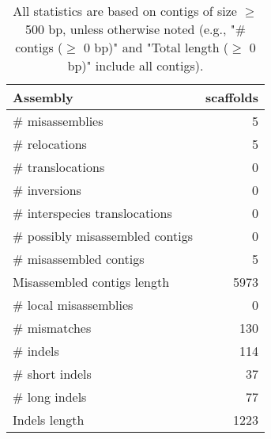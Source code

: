 \documentclass[12pt,a4paper]{article}
\begin{document}
\begin{table}[ht]
\begin{center}
\caption{All statistics are based on contigs of size $\geq$ 500 bp, unless otherwise noted (e.g., "\# contigs ($\geq$ 0 bp)" and "Total length ($\geq$ 0 bp)" include all contigs).}
\begin{tabular}{|l*{1}{|r}|}
\hline
Assembly & scaffolds \\ \hline
\# misassemblies & 5 \\ \hline
\hspace{5mm}\# relocations & 5 \\ \hline
\hspace{5mm}\# translocations & 0 \\ \hline
\hspace{5mm}\# inversions & 0 \\ \hline
\hspace{5mm}\# interspecies translocations & 0 \\ \hline
\# possibly misassembled contigs & 0 \\ \hline
\# misassembled contigs & 5 \\ \hline
Misassembled contigs length & 5973 \\ \hline
\# local misassemblies & 0 \\ \hline
\# mismatches & 130 \\ \hline
\# indels & 114 \\ \hline
\hspace{5mm}\# short indels & 37 \\ \hline
\hspace{5mm}\# long indels & 77 \\ \hline
Indels length & 1223 \\ \hline
\end{tabular}
\end{center}
\end{table}
\end{document}
